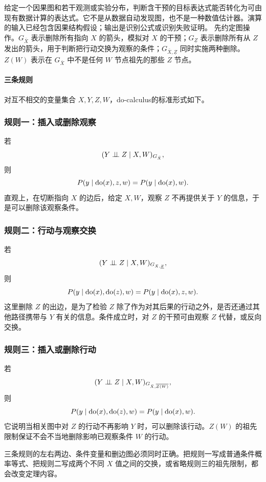 给定一个因果图和若干观测或实验分布，判断含干预的目标表达式能否转化为可由现有数据计算的表达式。它不是从数据自动发现图，也不是一种数值估计器。演算的输入已经包含因果结构假设；输出是识别公式或识别失败证明。
先约定图操作。$G_{\bar X}$ 表示删除所有指向 $X$ 的箭头，模拟对 $X$ 的干预；$G_{\underline Z}$ 表示删除所有从 $Z$ 发出的箭头，用于判断把行动交换为观察的条件；$G_{\bar X,\underline Z}$ 同时实施两种删除。$Z(W)$ 表示在 $G_{\bar X}$ 中不是任何 $W$ 节点祖先的那些 $Z$ 节点。

\paragraph{三条规则}

对互不相交的变量集合 $X,Y,Z,W$，do-calculus的标准形式如下\parencite{pearl1995,pearl2009}。

\subsubsection{规则一：插入或删除观察}

若
\[
(Y\mathrel{\perp\!\!\!\perp} Z\mid X,W)_{G_{\bar X}},
\]
则
\[
P(y\mid\operatorname{do}(x),z,w)=P(y\mid\operatorname{do}(x),w).
\]
直观上，在切断指向 $X$ 的边后，给定 $X,W$，观察 $Z$ 不再提供关于 $Y$ 的信息，于是可以删除该观察条件。

\subsubsection{规则二：行动与观察交换}

若
\[
(Y\mathrel{\perp\!\!\!\perp} Z\mid X,W)_{G_{\bar X,\underline Z}},
\]
则
\[
P(y\mid\operatorname{do}(x),\operatorname{do}(z),w)
=P(y\mid\operatorname{do}(x),z,w).
\]
这里删除 $Z$ 的出边，是为了检验 $Z$ 除了作为对其后果的行动之外，是否还通过其他路径携带与 $Y$ 有关的信息。条件成立时，对 $Z$ 的干预可由观察 $Z$ 代替，或反向交换。

\subsubsection{规则三：插入或删除行动}

若
\[
(Y\mathrel{\perp\!\!\!\perp} Z\mid X,W)_{G_{\bar X,\overline{Z(W)}}},
\]
则
\[
P(y\mid\operatorname{do}(x),\operatorname{do}(z),w)
=P(y\mid\operatorname{do}(x),w).
\]
它说明当相关图中对 $Z$ 的行动不再影响 $Y$ 时，可以删除该行动。$Z(W)$ 的祖先限制保证不会不当地删除影响已观察条件 $W$ 的行动。

\begin{keypoint}
三条规则的左右两边、条件变量和删边图必须同时正确。把规则一写成普通条件概率等式、把规则二写成两个不同 $X$ 值之间的交换，或省略规则三的祖先限制，都会改变定理内容。
\end{keypoint}

